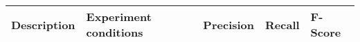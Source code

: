 \documentclass[10pt]{article}
\begin{document}
	\begin{table}[ht!]
	\centering
	\begin{tabular}{|l|l|lll|}
%		
%		
%		

	\hline Description & Experiment conditions & Precision & Recall & F-Score \\ \hline 



\end{tabular}
\end{table}
\end{document}
